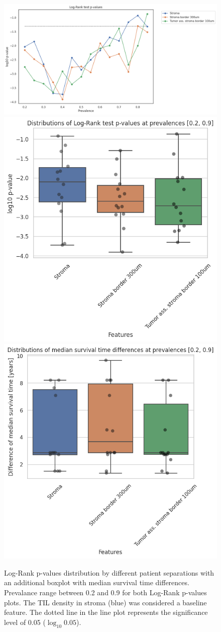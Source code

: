 \begin{figure}[h!]
\includegraphics[width=\linewidth]{figures/survival/pvalue_prevalence_selected.png}
\includegraphics[width=0.5\linewidth]{figures/survival/pvalue_boxplot_selected.png}
\includegraphics[width=0.5\linewidth]{figures/survival/surv_time_boxplot_selected.png}
\caption{Log-Rank p-values distribution by different patient separations with an additional boxplot
with median survival time differences.
Prevalance range between 0.2 and 0.9 for both Log-Rank p-values plots.
The TIL density in stroma (blue) was considered a baseline feature.
The dotted line in the line plot represents the significance level of 0.05 ($\log_{10} 0.05$).
}
\label{fig:pvalues_tils_selected}
\end{figure}

